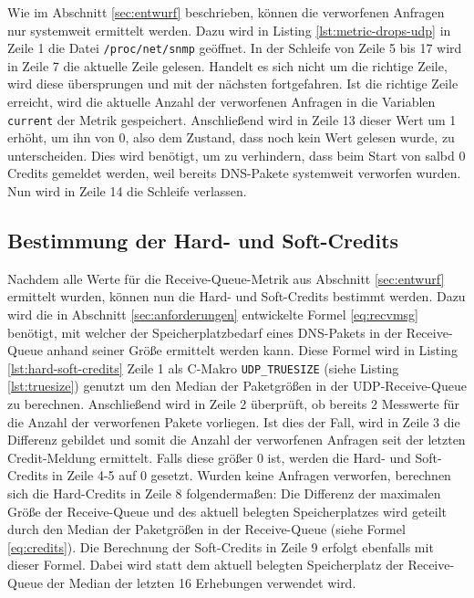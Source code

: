 \documentclass[a4paper, 12pt, BCOR10mm, DIV12, toc=bibliography, toc=listof, german]{scrbook}
\begin{document}
				Wie im Abschnitt \ref{sec:entwurf} beschrieben, können die verworfenen Anfragen nur
				systemweit ermittelt werden. Dazu wird in Listing \ref{lst:metric-drops-udp} in Zeile 1 die
				Datei \texttt{/proc/net/snmp} geöffnet. In der Schleife von Zeile 5 bis 17 wird in Zeile 7
				die aktuelle Zeile gelesen. Handelt es sich nicht um die richtige Zeile, wird diese
				übersprungen und mit der nächsten fortgefahren. Ist die richtige Zeile erreicht, wird die
				aktuelle Anzahl der verworfenen Anfragen in die Variablen \texttt{current} der Metrik
				gespeichert. Anschließend wird in Zeile 13 dieser Wert um 1 erhöht, um ihn von 0, also dem
				Zustand, dass noch kein Wert gelesen wurde, zu unterscheiden. Dies wird benötigt, um zu
				verhindern, dass beim Start von salbd 0 Credits gemeldet werden, weil bereits DNS-Pakete
				systemweit verworfen wurden. Nun wird in Zeile 14 die Schleife verlassen.

			



			\subsection*{Bestimmung der Hard- und Soft-Credits} %

			Nachdem alle Werte für die Receive-Queue-Metrik aus Abschnitt \ref{sec:entwurf} ermittelt
			wurden, können nun die Hard- und Soft-Credits bestimmt werden. Dazu wird die in Abschnitt
			\ref{sec:anforderungen} entwickelte Formel \ref{eq:recvmsg} benötigt, mit welcher der
			Speicherplatzbedarf eines DNS-Pakets in der Receive-Queue anhand seiner Größe ermittelt werden
			kann. Diese Formel wird in Listing \ref{lst:hard-soft-credits} Zeile 1 als C-Makro
			\texttt{UDP\_TRUESIZE} (siehe Listing \ref{lst:truesize}) genutzt um den Median der
			Paketgrößen in der UDP-Receive-Queue zu berechnen. Anschließend wird in Zeile 2 überprüft, ob
			bereits 2 Messwerte für die Anzahl der verworfenen Pakete vorliegen. Ist dies der Fall, wird
			in Zeile 3 die Differenz gebildet und somit die Anzahl der verworfenen Anfragen seit der
			letzten Credit-Meldung ermittelt. Falls diese größer 0 ist, werden die Hard- und Soft-Credits
			in Zeile 4-5 auf 0 gesetzt. Wurden keine Anfragen verworfen, berechnen sich die Hard-Credits
			in Zeile 8 folgendermaßen: Die Differenz der maximalen Größe der Receive-Queue und des aktuell
			belegten Speicherplatzes wird geteilt durch den Median der Paketgrößen in der Receive-Queue
			(siehe Formel \ref{eq:credits}).  Die Berechnung der Soft-Credits in Zeile 9 erfolgt ebenfalls
			mit dieser Formel. Dabei wird statt dem aktuell belegten Speicherplatz der Receive-Queue der
			Median der letzten 16 Erhebungen verwendet wird.
\end{document}
